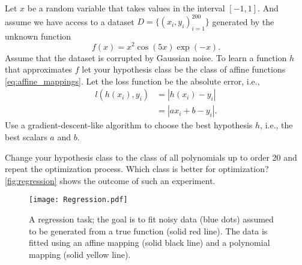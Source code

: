 \begin{boxedexample}[Regression] \complementary{\theexample}
    \label{ex:regression}
    Let $x$ be a random variable that takes values in the interval $[-1,1]$. And assume we
    have access to a dataset $D = \{(x_i, y_i)_{i=1}^{200}\}$ generated by the unknown
    function 
    $$
    f(x) = x^2 \cos(5x) \exp(-x).
    $$ 
    Assume that the dataset is corrupted by Gaussian noise.
    To learn a function $h$ that approximates $f$ let your hypothesis class be
    the class of affine functions \eqref{eq:affine_mappings}. Let the loss
    function be the absolute error, i.e., 
    \begin{align*}
    l(h(x_i), y_i) &= |h(x_i)- y_i| \\
& = |ax_i + b - y_i|.
    \end{align*}
    Use a gradient-descent-like algorithm to choose the best hypothesis $h$,
    i.e., the best scalars $a$ and $b$. 

    Change your hypothesis class to the class of all polynomials up to   order
    20 and repeat the optimization process. Which class is better for
    optimization? \autoref{fig:regression} shows the outcome of such an experiment.
\end{boxedexample}
\begin{figure}[htbp]
    \centering
    \texttt{[image: Regression.pdf]}
    \caption{A regression task; the goal is to fit noisy data (blue dots) assumed to be generated from a true function (solid red line). The data is fitted using an affine mapping (solid black line) and a polynomial mapping (solid yellow line).}
    \label{fig:regression}
\end{figure}   

